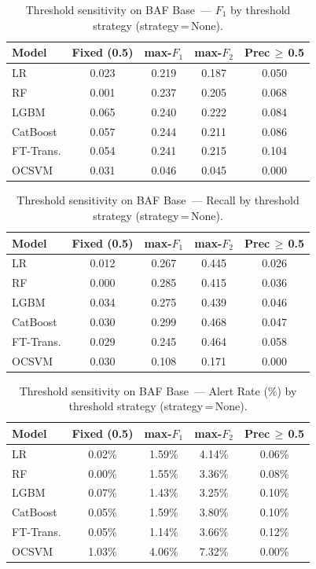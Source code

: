 \begin{table}[ht!]
\centering
\caption{Threshold sensitivity on BAF Base~--- $F_1$ by threshold strategy (strategy\,=\,None).}
\label{tab:threshold_baf_f1}
\begin{tabular}{l c c c c}
\toprule
Model & Fixed (0.5) & max-$F_1$ & max-$F_2$ & Prec\,$\geq$\,0.5 \\
\midrule
LR         & 0.023 & 0.219 & 0.187 & 0.050 \\
RF         & 0.001 & 0.237 & 0.205 & 0.068 \\
LGBM       & 0.065 & 0.240 & 0.222 & 0.084 \\
CatBoost   & 0.057 & 0.244 & 0.211 & 0.086 \\
FT-Trans.  & 0.054 & 0.241 & 0.215 & 0.104 \\
OCSVM      & 0.031 & 0.046 & 0.045 & 0.000 \\
\bottomrule
\end{tabular}
\end{table}

\begin{table}[ht!]
\centering
\caption{Threshold sensitivity on BAF Base~--- Recall by threshold strategy (strategy\,=\,None).}
\label{tab:threshold_baf_recall}
\begin{tabular}{l c c c c}
\toprule
Model & Fixed (0.5) & max-$F_1$ & max-$F_2$ & Prec\,$\geq$\,0.5 \\
\midrule
LR         & 0.012 & 0.267 & 0.445 & 0.026 \\
RF         & 0.000 & 0.285 & 0.415 & 0.036 \\
LGBM       & 0.034 & 0.275 & 0.439 & 0.046 \\
CatBoost   & 0.030 & 0.299 & 0.468 & 0.047 \\
FT-Trans.  & 0.029 & 0.245 & 0.464 & 0.058 \\
OCSVM      & 0.030 & 0.108 & 0.171 & 0.000 \\
\bottomrule
\end{tabular}
\end{table}

\begin{table}[ht!]
\centering
\caption{Threshold sensitivity on BAF Base~--- Alert Rate (\%) by threshold strategy (strategy\,=\,None).}
\label{tab:threshold_baf_alert}
\begin{tabular}{l c c c c}
\toprule
Model & Fixed (0.5) & max-$F_1$ & max-$F_2$ & Prec\,$\geq$\,0.5 \\
\midrule
LR         & 0.02\% & 1.59\% & 4.14\% & 0.06\% \\
RF         & 0.00\% & 1.55\% & 3.36\% & 0.08\% \\
LGBM       & 0.07\% & 1.43\% & 3.25\% & 0.10\% \\
CatBoost   & 0.05\% & 1.59\% & 3.80\% & 0.10\% \\
FT-Trans.  & 0.05\% & 1.14\% & 3.66\% & 0.12\% \\
OCSVM      & 1.03\% & 4.06\% & 7.32\% & 0.00\% \\
\bottomrule
\end{tabular}
\end{table}

